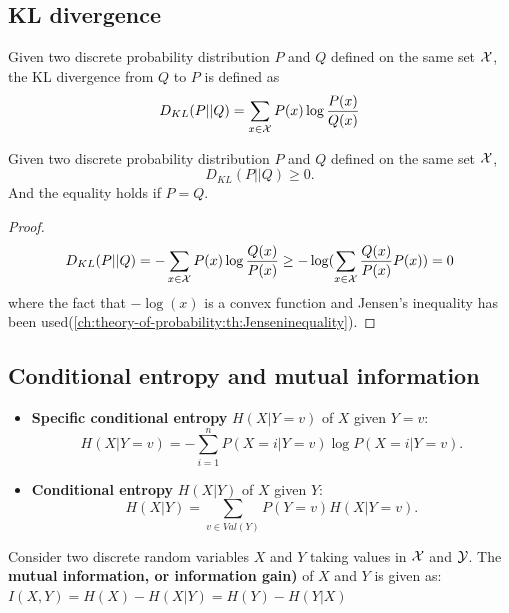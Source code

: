 \begin{refsection}
\subsection{KL divergence}

\begin{definition}
	Given two discrete probability distribution $P$ and $Q$ defined on the same set $\mathcal{X}$, the KL divergence from $Q$ to $P$ is defined as
	$$D_{KL}(P||Q) = \sum_{x\in\mathcal{X}} P(x)\log \frac{P(x)}{Q(x)}$$ 
\end{definition}

\begin{lemma}
	Given two discrete probability distribution $P$ and $Q$ defined on the same set $\mathcal{X}$,
	$$D_{KL}(P||Q)\geq 0.$$
	And the equality holds if $P=Q$.
\end{lemma}
\begin{proof}
	$$D_{KL}(P||Q) = -\sum_{x\in\mathcal{X}} P(x)\log \frac{Q(x)}{P(x)}\geq - \log (\sum_{x\in\mathcal{X}} \frac{Q(x)}{P(x)} P(x)) = 0$$
	where the fact that $-\log(x)$ is a convex function and Jensen's inequality has been used(\autoref{ch:theory-of-probability:th:Jenseninequality}).
\end{proof}

\subsection{Conditional entropy and mutual information}


\begin{definition}\hfill
	\begin{itemize}
		\item \textbf{Specific conditional entropy} $H(X|Y=v)$ of $X$ given $Y=v$:
		$$H(X|Y=v) = - \sum_{i=1}^n P(X=i|Y=v)\log P(X=i|Y=v).$$
		\item \textbf{Conditional entropy} $H(X|Y)$ of $X$ given $Y$:
		$$H(X|Y) = \sum_{v\in Val(Y)}P(Y=v)H(X|Y=v).$$
	\end{itemize}
\end{definition}


\begin{definition}\cite{cover2012elements}
	Consider two discrete random variables $X$ and $Y$ taking values in $\mathcal{X}$ and $\mathcal{Y}$. The \textbf{mutual information, or information gain)} of $X$ and $Y$ is given as:
	$I(X,Y) = H(X) - H(X|Y) = H(Y) - H(Y|X)$
\end{definition}


\end{refsection}
